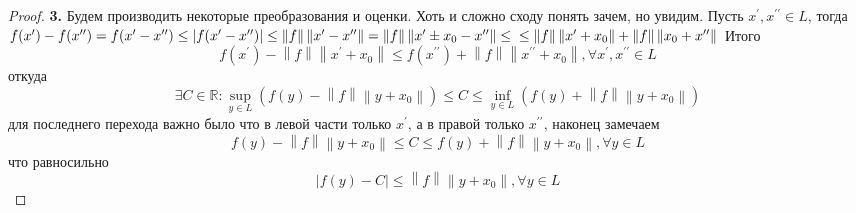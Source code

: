 \documentclass[12pt,a4paper]{article}
\theoremstyle{definition}
\newcommand{\Real}{\mathbb{R}}
\newcommand{\norm}[1]{\left\lVert#1\right\rVert}
\newcommand{\tick}[1]{#1^{\prime}}
\newcommand{\dtick}[1]{#1^{\prime\prime}}
\begin{document}
\begin{proof}
	\textbf{3.} Будем производить некоторые преобразования и оценки. Хоть и сложно сходу понять зачем, но увидим. Пусть $\tick{x}, \dtick{x} \in L$, тогда \newline\newline
	$f(\tick{x}) - f(\dtick{x}) = 
	f(\tick{x} - \dtick{x}) \leq |f(\tick{x} - \dtick{x})| \leq
	\norm{f}\norm{\tick{x} - \dtick{x}} =
	\norm{f}\norm{\tick{x} \pm x_0 - \dtick{x}} \leq \\
	\leq \norm{f}\norm{\tick{x} + x_0} + \norm{f}\norm{x_0 + \dtick{x}}$ \newline
	Итого 
	$$f(\tick{x}) - \norm{f}\norm{\tick{x} + x_0} \leq  f(\dtick{x}) + \norm{f}\norm{\dtick{x} + x_0}, \forall \tick{x},\dtick{x} \in L$$ 
	откуда
	$$\exists C \in \Real: \sup_{y \in L}{(f(y) - \norm{f}\norm{y + x_0})} \leq C \leq
	\inf_{y \in L}{(f(y) + \norm{f}\norm{y + x_0})}$$ \newline
	для последнего перехода важно было что в левой части только $\tick{x}$, а в правой только $\dtick{x}$, наконец замечаем
	$$f(y) - \norm{f}\norm{y + x_0} \leq C \leq f(y) + \norm{f}\norm{y + x_0}, \forall y \in L$$
	что равносильно
	\begin{equation}\label{eq:1}
		|f(y) - C| \leq \norm{f}\norm{y + x_0}, \forall y \in L 
	\end{equation}
	\newline
	

\end{proof}
\end{document}
